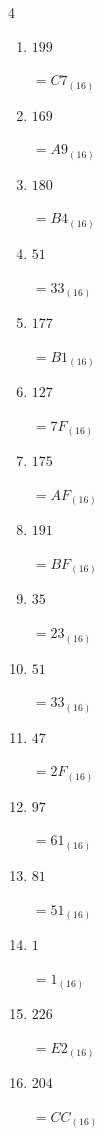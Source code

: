 \begin{multicols}{4}
\begin{enumerate}
        $=31_{(16)}$

  \item $199$

        $=C7_{(16)}$

  \item $169$

        $=A9_{(16)}$

  \item $180$

        $=B4_{(16)}$

  \item $51$

        $=33_{(16)}$

  \item $177$

        $=B1_{(16)}$

  \item $127$

        $=7F_{(16)}$

  \item $175$

        $=AF_{(16)}$

  \item $191$

        $=BF_{(16)}$

  \item $35$

        $=23_{(16)}$

  \item $51$

        $=33_{(16)}$

  \item $47$

        $=2F_{(16)}$

\columnbreak %

  \item $97$

        $=61_{(16)}$

  \item $81$

        $=51_{(16)}$

  \item $1$

        $=1_{(16)}$

  \item $226$

        $=E2_{(16)}$

  \item $204$

        $=CC_{(16)}$


\end{enumerate}
\end{multicols}
